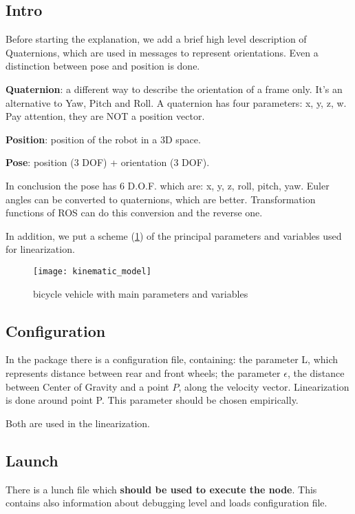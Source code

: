 \subsection{Intro}

Before starting the explanation, we add a brief high level description of Quaternions, which are used in messages to represent orientations. Even a distinction between pose and position is done.

\textbf{Quaternion}: a different way to describe the orientation of a frame only. It's an alternative to Yaw, Pitch and Roll. A quaternion has four parameters: x, y, z, w. Pay attention, they are NOT a position vector.

\textbf{Position}: position of the robot in a 3D space.

\textbf{Pose}: position (3 DOF) + orientation (3 DOF).

In conclusion the pose has 6 D.O.F. which are: x, y, z, roll, pitch, yaw. Euler angles can be converted to quaternions, which are better. Transformation functions of ROS can do this conversion and the reverse one.

In addition, we put a scheme (\ref{fig:bicycle_vehicle}) of the principal parameters and variables  used for linearization.

\begin{figure}[h]
	\texttt{[image: kinematic\_model]}
	\caption{bicycle vehicle with main parameters and variables}
	\label{fig:bicycle_vehicle}
\end{figure}

\subsection{Configuration}

In the package there is a configuration file, containing: the parameter L, which represents distance between rear and front wheels; the parameter $\epsilon$, the distance between Center of Gravity and a point $P$, along the velocity vector. Linearization is done around point P. This parameter should be chosen empirically.

Both are used in the linearization.

\subsection{Launch}

There is a lunch file which \textbf{should be used to execute the node}. This contains also information about debugging level and loads configuration file.

